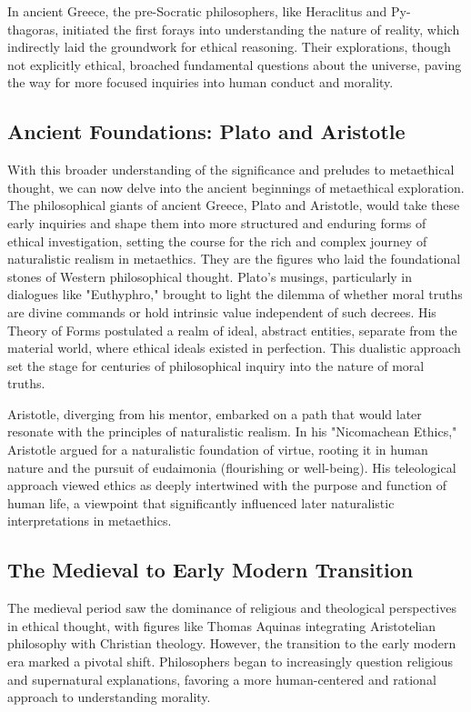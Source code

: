 \documentclass[12pt,a4paper]{article}
\begin{document}
In ancient Greece, the pre-Socratic philosophers, like Heraclitus and Py- thagoras, initiated the first forays into understanding the nature of reality, which indirectly laid the groundwork for ethical reasoning. Their explorations, though not explicitly ethical, broached fundamental questions about the universe, paving the way for more focused inquiries into human conduct and morality.

\subsection{Ancient Foundations: Plato and Aristotle}
With this broader understanding of the significance and preludes to metaethical thought, we can now delve into the ancient beginnings of metaethical exploration. The philosophical giants of ancient Greece, Plato and Aristotle, would take these early inquiries and shape them into more structured and enduring forms of ethical investigation, setting the course for the rich and complex journey of naturalistic realism in metaethics. They are the figures who laid the foundational stones of Western philosophical thought. Plato's musings, particularly in dialogues like "Euthyphro," brought to light the dilemma of whether moral truths are divine commands or hold intrinsic value independent of such decrees. His Theory of Forms postulated a realm of ideal, abstract entities, separate from the material world, where ethical ideals existed in perfection. This dualistic approach set the stage for centuries of philosophical inquiry into the nature of moral truths.

Aristotle, diverging from his mentor, embarked on a path that would later resonate with the principles of naturalistic realism. In his "Nicomachean Ethics," Aristotle argued for a naturalistic foundation of virtue, rooting it in human nature and the pursuit of eudaimonia (flourishing or well-being). His teleological approach viewed ethics as deeply intertwined with the purpose and function of human life, a viewpoint that significantly influenced later naturalistic interpretations in metaethics.

\subsection{The Medieval to Early Modern Transition}
The medieval period saw the dominance of religious and theological perspectives in ethical thought, with figures like Thomas Aquinas integrating Aristotelian philosophy with Christian theology. However, the transition to the early modern era marked a pivotal shift. Philosophers began to increasingly question religious and supernatural explanations, favoring a more human-centered and rational approach to understanding morality.
\end{document}
